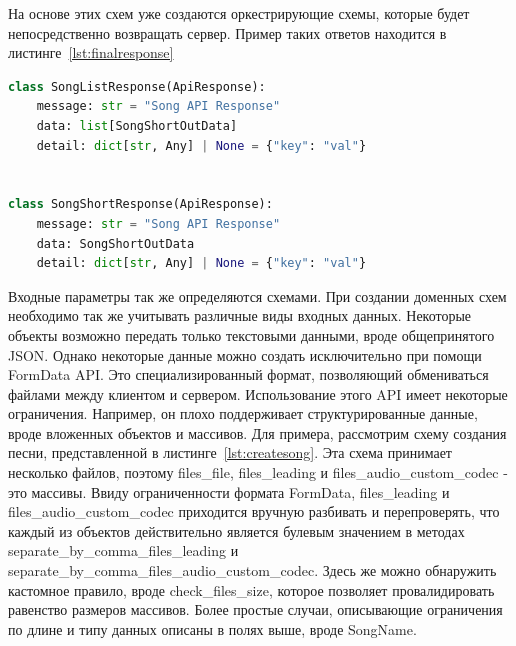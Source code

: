\documentclass[14pt]{extarticle}
\begin{document}
На основе этих схем уже создаются оркестрирующие схемы, которые будет непосредственно возвращать сервер. Пример таких ответов находится в листинге~\ref{lst:finalresponse}
\begin{lstlisting}[caption={Оркестрирующая схема ответа}, label={lst:finalresponse}, language=Python]
class SongListResponse(ApiResponse):
    message: str = "Song API Response"
    data: list[SongShortOutData]
    detail: dict[str, Any] | None = {"key": "val"}


class SongShortResponse(ApiResponse):
    message: str = "Song API Response"
    data: SongShortOutData
    detail: dict[str, Any] | None = {"key": "val"}
\end{lstlisting}

Входные параметры так же определяются схемами. При создании доменных схем необходимо так же учитывать различные виды входных данных. Некоторые
объекты возможно передать только текстовыми данными, вроде общепринятого JSON. Однако некоторые данные можно создать исключительно при помощи
FormData API. Это специализированный формат, позволяющий обмениваться файлами между клиентом и сервером. Использование этого API имеет некоторые ограничения. 
Например, он плохо поддерживает структурированные данные, вроде вложенных объектов и массивов. Для примера, рассмотрим схему создания песни, представленной
в листинге~\ref{lst:createsong}. Эта схема принимает несколько файлов, поэтому files\_file, files\_leading и files\_audio\_custom\_codec - это массивы. Ввиду 
ограниченности формата FormData, files\_leading и files\_audio\_custom\_codec приходится вручную разбивать и перепроверять, что каждый из объектов действительно
является булевым значением в методах separate\_by\_comma\_files\_leading и separate\_by\_comma\_files\_audio\_custom\_codec. Здесь же можно обнаружить
кастомное правило, вроде check\_files\_size, которое позволяет провалидировать равенство размеров массивов. Более простые случаи, описывающие
ограничения по длине и типу данных описаны в полях выше, вроде SongName. 
\end{document}
